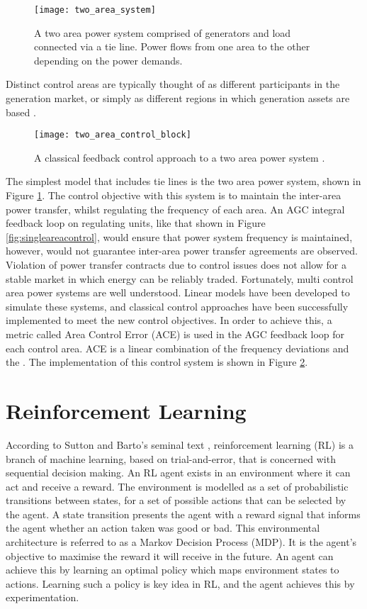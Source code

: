 \begin{figure}[ht]
	\centering
	\texttt{[image: two\_area\_system]}
	\caption{A two area power system comprised of generators and load connected via a tie line. Power flows from one area to the other depending on the power demands.}
	\label{fig:twoareapower}
\end{figure}

Distinct control areas are typically thought of as different participants in the generation market, or simply as different regions in which generation assets are based \cite{Kothari2011}.

\begin{figure}[ht]
	\centering
	\texttt{[image: two\_area\_control\_block]}
	\caption{A classical feedback control approach to a two area power system \cite{Kundur1994}.}
	\label{fig:twoareacontrolblock}
\end{figure}

The simplest model that includes tie lines is the two area power system, shown in Figure \ref{fig:twoareapower}. The control objective with this system is to maintain the inter-area power transfer, whilst regulating the frequency of each area. An AGC integral feedback loop on regulating units, like that shown in Figure \ref{fig:singleareacontrol}, would ensure that power system frequency is maintained, however, would not guarantee inter-area power transfer agreements are observed. Violation of power transfer contracts due to control issues does not allow for a stable market in which energy can be reliably traded. Fortunately, multi control area power systems are well understood. Linear models have been developed to simulate these systems, and classical control approaches have been successfully implemented to meet the new control objectives. In order to achieve this, a metric called Area Control Error (ACE) is used in the AGC feedback loop for each control area. ACE is a linear combination of the frequency deviations and the . The implementation of this control system is shown in Figure \ref{fig:twoareacontrolblock}.


\section{Reinforcement Learning}\label{rl}
According to Sutton and Barto's seminal text \cite{Sutton2018}, reinforcement learning (RL) is a branch of machine learning, based on trial-and-error, that is concerned with sequential decision making. An RL agent exists in an environment where it can act and receive a reward. The environment is modelled as a set of probabilistic transitions between states, for a set of possible actions that can be selected by the agent. A state transition presents the agent with a reward signal that informs the agent whether an action taken was good or bad. This environmental architecture is referred to as a Markov Decision Process (MDP). It is the agent's objective to maximise the reward it will receive in the future. An agent can achieve this by learning an optimal policy which maps environment states to actions. Learning such a policy is key idea in RL, and the agent achieves this by experimentation.


